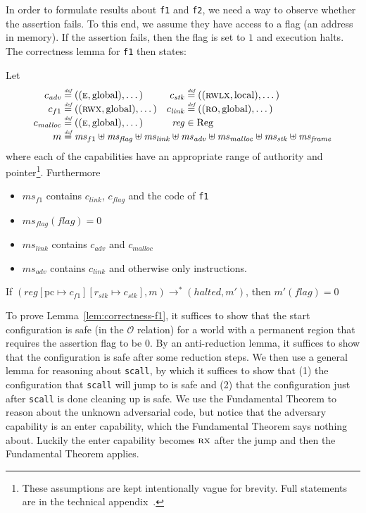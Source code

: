 \documentclass[format=acmsmall, review=false, screen=true]{acmart}
\newcommand{\update}[2]{[#1 \mapsto #2]}
\newcommand{\defeq}{\stackrel{\textit{\tiny{def}}}{=}}
\newcommand{\var}[1]{\mathit{#1}}
\newcommand{\hs}{\var{ms}}
\newcommand{\ms}{\hs}
\newcommand{\pcreg}{\mathrm{pc}}
\newcommand{\reg}{\var{reg}}
\newcommand{\adv}{\var{adv}}
\newcommand{\link}{\var{link}}
\newcommand{\stk}{\var{stk}}
\newcommand{\flag}{\var{flag}}
\newcommand{\halted}{\mathit{halted}}
\newcommand{\codelabel}[1]{\mathit{#1}}
\newcommand{\malloc}{\codelabel{malloc}}
\newcommand{\plaindom}[1]{\mathrm{#1}}
\newcommand{\Regs}{\plaindom{Reg}}
\newcommand{\observations}{\mathcal{O}}
\newcommand{\plainperm}[1]{\textsc{#1}}
\newcommand{\readonly}{\plainperm{ro}}
\newcommand{\exec}{\plainperm{rx}}
\newcommand{\entry}{\plainperm{e}}
\newcommand{\rwx}{\plainperm{rwx}}
\newcommand{\rwlx}{\plainperm{rwlx}}
\newcommand{\plainlocality}[1]{\mathrm{#1}}
\newcommand{\local}{\plainlocality{local}}
\newcommand{\glob}{\plainlocality{global}}
\newcommand{\step}[1][]{\rightarrow_{#1}}
\begin{document}
In order to formulate results about \texttt{\footnotesize{f1}} and
\texttt{\footnotesize{f2}}, we need a way to observe whether the assertion
fails. To this end, we assume they have access to a flag (an address in memory).
If the assertion fails, then the flag is set to $1$ and execution halts. The correctness lemma
for \texttt{\footnotesize{f1}} then states:
\begin{lemma}
  \label{lem:correctness-f1}
  Let
\[
    \begin{array}{r@{}lr@{}l}
    c_\adv & \;\defeq ((\entry,\glob),\dots) & c_{\var{stk}} & \;\defeq ((\rwlx,\local),\dots)\\
    c_{f1} & \;\defeq ((\rwx,\glob),\dots) & c_\link &\; \defeq ((\readonly,\glob),\dots)\\
    c_\malloc &\; \defeq ((\entry,\glob),\dots) & \reg& \; \in \Regs \\
    m &  \multicolumn{3}{@{}l}{\;\defeq \ms_{f1} \uplus \ms_\flag \uplus \ms_{\var{link}} \uplus \hs_\adv \uplus \ms_{\malloc} \uplus \ms_{\var{stk}} \uplus \ms_{\var{frame}}} \\
    \end{array}
\]
where each of the capabilities have an appropriate range of authority and
pointer\footnote{These assumptions are kept intentionally vague for brevity.
  Full statements are in the technical appendix~\citep{technical_appendix}.}.
Furthermore
  \begin{itemize}
  \item $\ms_{f1}$ contains $c_\link$, $c_\flag$ and the code of \texttt{\footnotesize{f1}}
  \item $\ms_\flag(\flag) = 0$
  \item $\ms_{\var{link}}$ contains $c_\adv$ and $c_\malloc$
  \item $\hs_\adv$ contains $c_\link$ and otherwise only instructions.
  \end{itemize}
  If $(\reg\update{\pcreg}{c_{f1}}\update{r_\stk}{c_\stk},m) \step^* (\halted,m')$,
  then $m'(\flag) = 0$
\end{lemma}

To prove Lemma~\ref{lem:correctness-f1}, it suffices to show that the start
configuration is safe (in the $\observations$ relation) for a world with a
permanent region that requires the assertion flag to be 0. By an anti-reduction
lemma, it suffices to show that the configuration is safe after some reduction
steps. We then use a general lemma for reasoning about
\texttt{\footnotesize{scall}}, by which it suffices to show that (1) the
configuration that \texttt{\footnotesize{scall}} will jump to is safe and (2)
that the configuration just after \texttt{\footnotesize{scall}} is done cleaning
up is safe. We use the Fundamental Theorem to reason about the unknown
adversarial code, but notice that the adversary capability is an enter
capability, which the Fundamental Theorem says nothing about. Luckily the enter
capability becomes $\exec$ after the jump and then the Fundamental Theorem
applies.
\end{document}
